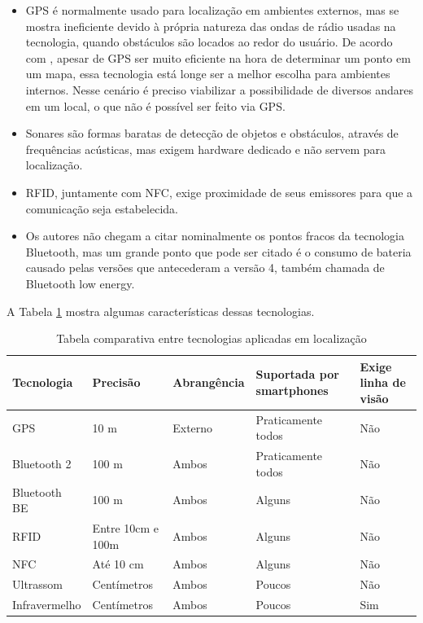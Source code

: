 \documentclass[english,brazilian]{UNISINOSmonografia}
\begin{document}
\begin{itemize}
  \item GPS é normalmente usado para localização em ambientes externos, mas se mostra ineficiente devido à própria natureza das ondas de rádio usadas na tecnologia, quando obstáculos são locados ao redor do usuário. De acordo com , apesar de GPS ser muito eficiente na hora de determinar um ponto em um mapa, essa tecnologia está longe ser a melhor escolha para ambientes internos. Nesse cenário é preciso viabilizar a possibilidade de diversos andares em um local, o que não é possível ser feito via GPS.
  \item Sonares são formas baratas de detecção de objetos e obstáculos, através de frequências acústicas, mas exigem hardware dedicado e não servem para localização.
  \item RFID, juntamente com NFC, exige proximidade de seus emissores para que a comunicação seja estabelecida.
  \item Os autores não chegam a citar nominalmente os pontos fracos da tecnologia Bluetooth, mas um grande ponto que pode ser citado é o consumo de bateria causado pelas versões que antecederam a versão 4, também chamada de Bluetooth low energy.
\end{itemize}

A Tabela \ref{tab:tecnologiasLocalizacao} mostra algumas características dessas tecnologias.

\FloatBarrier
\begin{table}
	\caption{Tabela comparativa entre tecnologias aplicadas em localização}
	\label{tab:tecnologiasLocalizacao}
		\begin{tabular}{ p{} | p{2cm} | p{} | p{3cm} | p{3cm} }
			\hline
				Tecnologia & Precisão & Abrangência & Suportada por smartphones & Exige linha de visão   \\ \hline
				GPS & 10 m & Externo & Praticamente todos & Não   \\ \hline
				Bluetooth 2 & 100 m & Ambos & Praticamente todos & Não   \\ \hline
				Bluetooth BE & 100 m & Ambos & Alguns & Não   \\ \hline
				RFID & Entre 10cm e 100m & Ambos & Alguns & Não   \\ \hline
				NFC & Até 10 cm & Ambos & Alguns & Não   \\ \hline
				Ultrassom & Centímetros & Ambos & Poucos & Não   \\ \hline
				Infravermelho & Centímetros & Ambos & Poucos & Sim   \\ \hline
			\end{tabular}
\end{table}
\FloatBarrier
\end{document}
